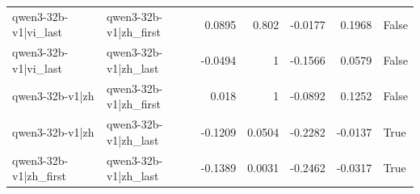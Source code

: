 \begin{table}
\begin{tabular}{l l r r r r l}
qwen3-32b-v1|vi_last & qwen3-32b-v1|zh_first & 0.0895 & 0.802 & -0.0177 & 0.1968 & False \\
qwen3-32b-v1|vi_last & qwen3-32b-v1|zh_last & -0.0494 & 1 & -0.1566 & 0.0579 & False \\
qwen3-32b-v1|zh & qwen3-32b-v1|zh_first & 0.018 & 1 & -0.0892 & 0.1252 & False \\
qwen3-32b-v1|zh & qwen3-32b-v1|zh_last & -0.1209 & 0.0504 & -0.2282 & -0.0137 & True \\
qwen3-32b-v1|zh_first & qwen3-32b-v1|zh_last & -0.1389 & 0.0031 & -0.2462 & -0.0317 & True \\
\bottomrule
\end{tabular}
\end{table}
